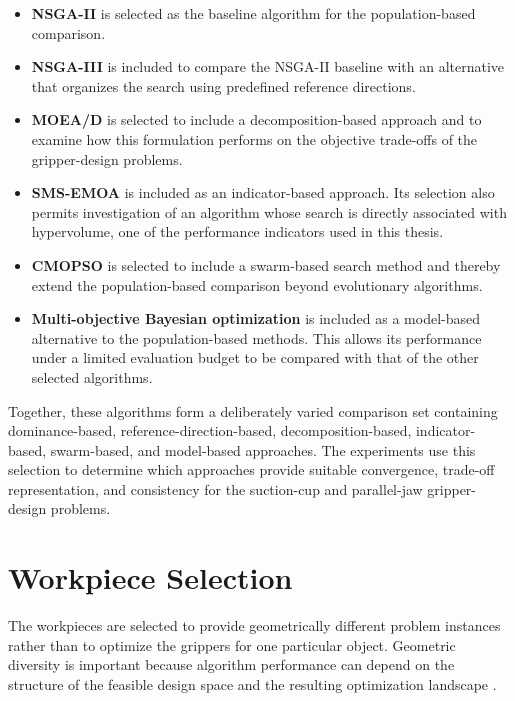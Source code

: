 \begin{itemize}
    \item \textbf{NSGA-II} is selected as the baseline algorithm for the population-based comparison.

    \item \textbf{NSGA-III} is included to compare the NSGA-II baseline with an alternative that organizes the search using predefined reference
    directions.

    \item \textbf{MOEA/D} is selected to include a decomposition-based approach and to examine how this formulation performs on the objective
    trade-offs of the gripper-design problems.

    \item \textbf{SMS-EMOA} is included as an indicator-based approach. Its selection also permits investigation of an algorithm whose search is
    directly associated with hypervolume, one of the performance indicators used in this thesis.

    \item \textbf{CMOPSO} is selected to include a swarm-based search method and thereby extend the population-based comparison beyond evolutionary
    algorithms.

    \item \textbf{Multi-objective Bayesian optimization} is included as a model-based alternative to the population-based methods. This allows its
    performance under a limited evaluation budget to be compared with that of the other selected algorithms.
\end{itemize}

Together, these algorithms form a deliberately varied comparison set containing dominance-based, reference-direction-based, decomposition-based,
indicator-based, swarm-based, and model-based approaches. The experiments use this selection to determine which approaches provide suitable
convergence, trade-off representation, and consistency for the suction-cup and parallel-jaw gripper-design problems.

\section{Workpiece Selection}
\label{sec:methodology_workpiece_selection}

The workpieces are selected to provide geometrically different problem instances rather than to optimize the grippers for one particular object.
Geometric diversity is important because algorithm performance can depend on the structure of the feasible design space and the resulting optimization
landscape \cite{Cenikj2022SELECTOR:,Yazdani2020Benchmarking}.

